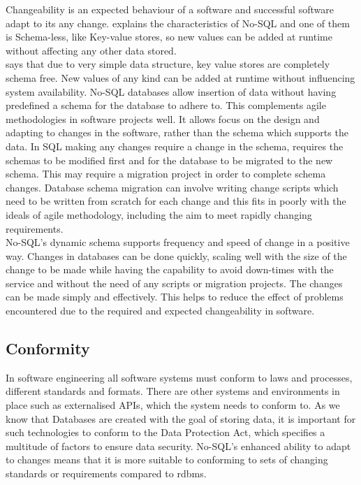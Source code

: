 \documentclass{article} %
\begin{document}
Changeability is an expected behaviour of a software and successful 
software adapt to its any change.
\citealp{chandra2015base} explains the characteristics of No-SQL and one of 
them is Schema-less, like Key-value stores, so new values can be added at runtime
without affecting any other data stored.\\
\cite{hecht2011nosql} says that due to very simple data structure, key value stores are completely
schema free. New values of any kind can be added at runtime
without influencing system availability.
No-SQL databases allow insertion of data without having predefined a
schema for the database to adhere to.  This complements agile methodologies in
software projects well. It allows focus on the design
and adapting to changes in the software, rather than
the schema which supports the data.
In SQL making any changes require
a change in the schema, requires the schemas
to be modified first and for the database to be
migrated to the new schema. This may require
a migration project in order to complete schema
changes. Database schema migration can involve
writing change scripts which need to be written from
scratch for each change and this fits in poorly with the ideals of
agile methodology, including the aim to meet rapidly
changing requirements.\\
No-SQL's dynamic schema supports frequency and
speed of change in a positive way. Changes in
databases can be done quickly, scaling well with
the size of the change to be made while having
the capability to avoid down-times with the service
and without the need of any scripts or migration
projects. The changes can be made simply and
effectively. This helps to reduce the effect of
problems encountered due to the required and
expected changeability in software.


\subsection{Conformity}
In software engineering all software systems must conform to laws and 
processes, different standards and formats. There are other systems and environments in 
place such as externalised APIs, which the system needs to conform to. 
As we know that Databases are created with the goal of storing data,
it is important for such technologies to conform to the Data Protection Act, which
specifies a multitude of factors to ensure data security.
No-SQL's enhanced ability to adapt to changes means that it is more suitable to conforming
to sets of changing standards or requirements compared to \acrshort{rdbms}.
\end{document}
